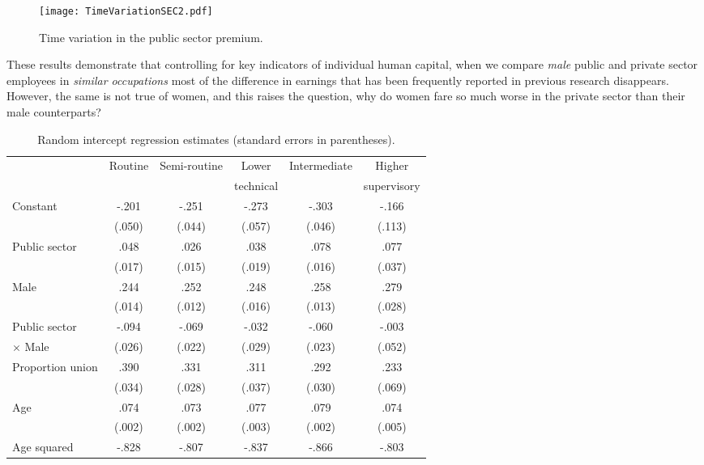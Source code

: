 \documentclass[a4paper,11pt,titlepage]{article}
\begin{document}
\begin{figure}[ht]
    \texttt{[image: TimeVariationSEC2.pdf]}
    \caption{Time variation in the public sector premium. \label{fig:time}}
\end{figure}

These results demonstrate that controlling for key indicators of individual human capital, when we compare \emph{male} public and private sector employees in \emph{similar occupations} most of the difference in earnings that has been frequently reported in previous research disappears.  However, the same is not true of women, and this raises the question, why do women fare so much worse in the private sector than their male counterparts?


\begin{table}[tb]
    \caption{Random intercept regression estimates (standard errors in parentheses).\label{tab:union}}
    \begin{tabularx}{\textwidth}{Yccccc}
    \toprule
                    &Routine    &Semi-routine &Lower &Intermediate    &Higher \\
                    &           &             &technical&           &supervisory \\
    \midrule
    Constant		&-.201     	&-.251		&-.273	&-.303	&-.166\\
    				&(.050)	    &(.044)	    &(.057)	&(.046)	&(.113)\\
    Public sector	&.048		&.026		&.038	&.078	&.077\\
    				&(.017)	    &(.015)	    &(.019)	&(.016)	&(.037)\\
    Male			&.244	    &.252	    &.248	&.258	&.279\\
    				&(.014)	    &(.012)	    &(.016)	&(.013)	&(.028)\\
    Public sector   &-.094	    &-.069	    &-.032	&-.060	&-.003\\
    \quad $\times	$ Male%
    				&(.026)	    &(.022)	    &(.029)	&(.023) &(.052)\\
    Proportion union&.390       &.331       &.311   &.292   &.233 \\
                    &(.034)     &(.028)     &(.037) &(.030) &(.069) \\
    Age				&.074	    &.073    	&.077	&.079	&.074\\
    				&(.002)	    &(.002)	    &(.003)	&(.002)	&(.005)\\
    Age squared		&-.828	    &-.807	    &-.837	&-.866	&-.803\\

\end{tabularx}
\end{table}
\end{document}
